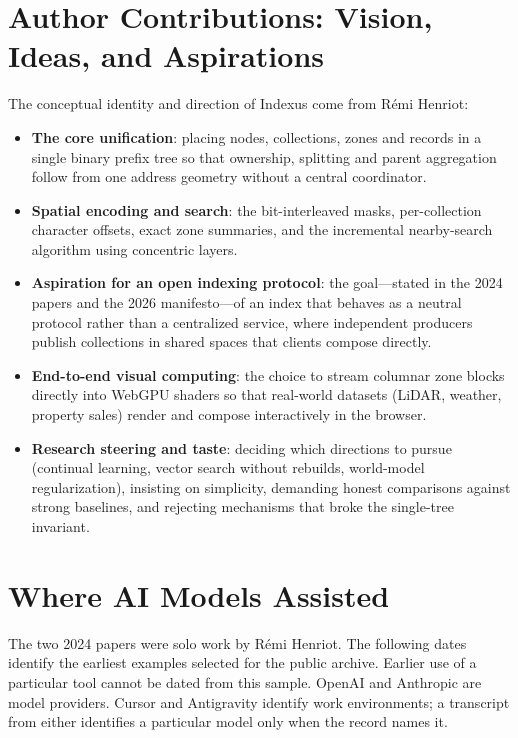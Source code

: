 \documentclass[11pt]{article}
\begin{document}
\section{Author Contributions: Vision, Ideas, and Aspirations}\hypertarget{ix:author}{}
The conceptual identity and direction of Indexus come from Rémi Henriot:
\begin{itemize}[leftmargin=1.5em,itemsep=1pt]
  \item \textbf{The core unification}: placing nodes, collections, zones and records in a single binary prefix tree so that ownership, splitting and parent aggregation follow from one address geometry without a central coordinator.
  \item \textbf{Spatial encoding and search}: the bit-interleaved masks, per-collection character offsets, exact zone summaries, and the incremental nearby-search algorithm using concentric layers.
  \item \textbf{Aspiration for an open indexing protocol}: the goal---stated in the 2024 papers and the 2026 manifesto---of an index that behaves as a neutral protocol rather than a centralized service, where independent producers publish collections in shared spaces that clients compose directly.
  \item \textbf{End-to-end visual computing}: the choice to stream columnar zone blocks directly into WebGPU shaders so that real-world datasets (LiDAR, weather, property sales) render and compose interactively in the browser.
  \item \textbf{Research steering and taste}: deciding which directions to pursue (continual learning, vector search without rebuilds, world-model regularization), insisting on simplicity, demanding honest comparisons against strong baselines, and rejecting mechanisms that broke the single-tree invariant.
\end{itemize}

\section{Where AI Models Assisted}\hypertarget{ix:ai}{}
The two 2024 papers were solo work by Rémi Henriot. The following dates identify the earliest examples selected for the public archive. Earlier use of a particular tool cannot be dated from this sample. OpenAI and Anthropic are model providers. Cursor and Antigravity identify work environments; a transcript from either identifies a particular model only when the record names it.
\end{document}
